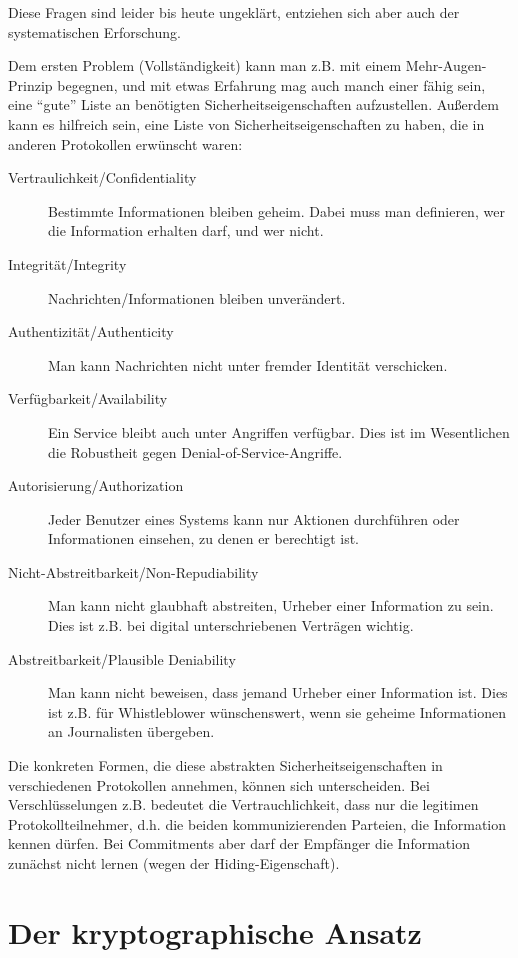 Diese Fragen sind leider bis heute ungeklärt, entziehen sich aber auch der systematischen Erforschung.

Dem ersten Problem (Vollständigkeit) kann man z.B. mit einem Mehr-Augen-Prinzip begegnen, und mit etwas Erfahrung mag auch manch einer fähig sein, eine "`gute"' Liste an benötigten Sicherheitseigenschaften aufzustellen.
Außerdem kann es hilfreich sein, eine Liste von Sicherheitseigenschaften zu haben, die in anderen Protokollen erwünscht waren:

\begin{description}
	\item[Vertraulichkeit/Confidentiality] Bestimmte Informationen bleiben geheim. Dabei muss man definieren, wer die Information erhalten darf, und wer nicht.
	\item[Integrität/Integrity] Nachrichten/Informationen bleiben unverändert.
	\item[Authentizität/Authenticity] Man kann Nachrichten nicht unter fremder Identität verschicken.
	\item[Verfügbarkeit/Availability] Ein Service bleibt auch unter Angriffen verfügbar. Dies ist im Wesentlichen die Robustheit gegen Denial-of-Service-Angriffe.
	\item[Autorisierung/Authorization] Jeder Benutzer eines Systems kann nur Aktionen durchführen oder Informationen einsehen, zu denen er berechtigt ist.
	\item[Nicht-Abstreitbarkeit/Non-Repudiability] Man kann nicht glaubhaft abstreiten, Urheber einer Information zu sein. Dies ist z.B. bei digital unterschriebenen Verträgen wichtig.
	\item[Abstreitbarkeit/Plausible Deniability] Man kann nicht beweisen, dass jemand Urheber einer Information ist. Dies ist z.B. für Whistleblower wünschenswert, wenn sie geheime Informationen an Journalisten übergeben.
\end{description}

Die konkreten Formen, die diese abstrakten Sicherheitseigenschaften in verschiedenen Protokollen annehmen, können sich unterscheiden.
Bei Verschlüsselungen z.B. bedeutet die Vertrauchlichkeit, dass nur die legitimen Protokollteilnehmer, d.h. die beiden kommunizierenden Parteien, die Information kennen dürfen.
Bei Commitments aber darf der Empfänger die Information zunächst nicht lernen (wegen der Hiding-Eigenschaft).

\section{Der kryptographische Ansatz}

